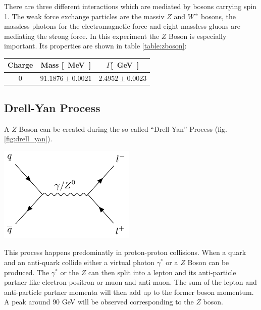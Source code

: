 \documentclass[12pt, a4paper, bibliography=totoc]{scrartcl}
\begin{document}
\begin{multicols}{2}
There are three different interactions which are mediated by bosons carrying spin 1.
The weak force exchange particles are the massiv $Z$ and $W^{\pm}$ bosons, the massless photons for the electromagnetic force and eight massless gluons are mediating the strong force. 
    In this experiment the $Z$ Boson is especially important. Its properties are shown in table \ref{table:zboson}:
        \begin{center}
            \begin{tabular*}{\linewidth}{c c c}
        \toprule
                Charge & Mass \si{[MeV]} & $\Gamma$\si{[GeV]}\\%
        \midrule
                \small{0} & \small {$91.1876 \pm 0.0021$} & \small{$2.4952 \pm 0.0023$} \\
        \bottomrule
    \end{tabular*}
        \label{table:zboson}
        \end{center}


\subsection{Drell-Yan Process}
A $Z$ Boson can be created during the so called ``Drell-Yan'' Process (fig. \ref{fig:drell_yan}). 

    \begin{center}
\includegraphics[width=0.7\linewidth]{fig/feynman_0.pdf}
\label{fig:drell_yan}
\end{center}

This process happens predominatly in proton-proton collisions.
When a quark and an anti-quark collide either a virtual photon $\gamma^\ast$ or a $Z$ Boson can be produced. 
The $\gamma^\ast$ or the $Z$ can then split into a lepton and its anti-particle partner like electron-positron or muon and anti-muon.
The sum of the lepton and anti-particle partner momenta will then add up to the former boson momentum. 
A peak around $90$ \si{GeV} will be observed corresponding to the $Z$ boson. 


\end{multicols}
\end{document}
